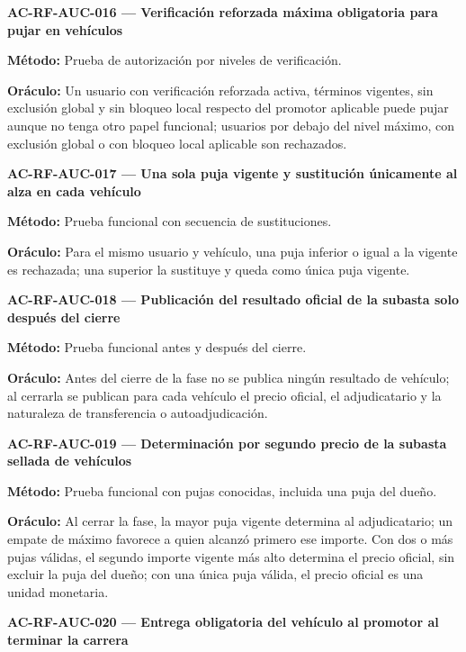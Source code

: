 \documentclass[10pt,letterpaper]{article}
\begin{document}
\noindent\textbf{AC-RF-AUC-016 --- Verificación reforzada máxima obligatoria para pujar en vehículos}\par
\textbf{Método:} Prueba de autorización por niveles de verificación.\par
\textbf{Oráculo:} Un usuario con verificación reforzada activa, términos vigentes, sin exclusión global y sin bloqueo local respecto del promotor aplicable puede pujar aunque no tenga otro papel funcional; usuarios por debajo del nivel máximo, con exclusión global o con bloqueo local aplicable son rechazados.\par\vspace{0.45em}
\noindent\textbf{AC-RF-AUC-017 --- Una sola puja vigente y sustitución únicamente al alza en cada vehículo}\par
\textbf{Método:} Prueba funcional con secuencia de sustituciones.\par
\textbf{Oráculo:} Para el mismo usuario y vehículo, una puja inferior o igual a la vigente es rechazada; una superior la sustituye y queda como única puja vigente.\par\vspace{0.45em}
\noindent\textbf{AC-RF-AUC-018 --- Publicación del resultado oficial de la subasta solo después del cierre}\par
\textbf{Método:} Prueba funcional antes y después del cierre.\par
\textbf{Oráculo:} Antes del cierre de la fase no se publica ningún resultado de vehículo; al cerrarla se publican para cada vehículo el precio oficial, el adjudicatario y la naturaleza de transferencia o autoadjudicación.\par\vspace{0.45em}
\noindent\textbf{AC-RF-AUC-019 --- Determinación por segundo precio de la subasta sellada de vehículos}\par
\textbf{Método:} Prueba funcional con pujas conocidas, incluida una puja del dueño.\par
\textbf{Oráculo:} Al cerrar la fase, la mayor puja vigente determina al adjudicatario; un empate de máximo favorece a quien alcanzó primero ese importe. Con dos o más pujas válidas, el segundo importe vigente más alto determina el precio oficial, sin excluir la puja del dueño; con una única puja válida, el precio oficial es una unidad monetaria.\par\vspace{0.45em}
\noindent\textbf{AC-RF-AUC-020 --- Entrega obligatoria del vehículo al promotor al terminar la carrera}\par
\end{document}
